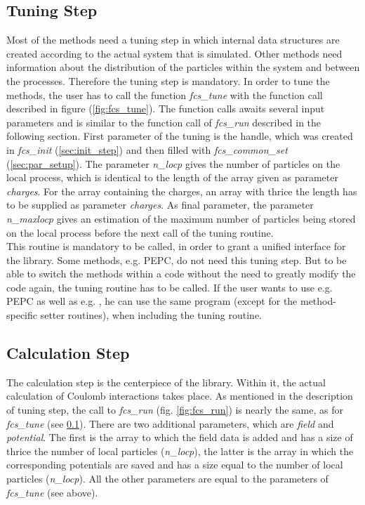 \subsection{Tuning Step}
\label{sec:tune_step}



Most of the methods need a tuning step in which internal data structures are created according to the actual system that is simulated. Other methods
need information about the distribution of the particles within the system and between the processes. Therefore the tuning step is mandatory. In order
to tune the methods, the user has to call the function \textit{fcs\_tune} with the function call described in figure (\ref{fig:fcs_tune}). The function
calls awaits several input parameters and is similar to the function call of \textit{fcs\_run} described in the following section. First parameter of the
tuning is the handle, which was created in \textit{fcs\_init} (\ref{sec:init_step}) and then filled with \textit{fcs\_common\_set} (\ref{sec:par_setup}).
The parameter \textit{n\_locp} gives the number of particles on the local process, which is identical to the length of the array given as parameter 
\textit{charges}. For the array containing the charges, an array with thrice the length has to be supplied as parameter \textit{charges}. As final parameter,
the parameter \textit{n\_maxlocp} gives an estimation of the maximum number of particles being stored on the local process before the next call of the tuning
routine.\\
This routine is mandatory to be called, in order to grant a unified interface for the library. Some methods, e.g. PEPC, do not need this tuning step. But to be
able to switch the methods within a code without the need to greatly modify the code again, the tuning routine has to be called. If the user wants to use e.g. PEPC
as well as e.g. \ptwonfft, he can use the same program (except for the method-specific setter routines), when including the tuning routine. 

\subsection{Calculation Step}
\label{sec:run_step}



The calculation step is the centerpiece of the library. Within it, the actual calculation of Coulomb interactions takes place. As mentioned in the description of tuning step,
the call to \textit{fcs\_run} (fig. \ref{fig:fcs_run}) is nearly the same, as for \textit{fcs\_tune} (see \ref{sec:tune_step}). There are two additional parameters, which are \textit{field} and
\textit{potential}. The first is the array to which the field data is added and has a size of thrice the number of local particles (\textit{n\_locp}), the latter
is the array in which the corresponding potentials are saved and has a size equal to the number of local particles (\textit{n\_locp}). All the other parameters
are equal to the parameters of \textit{fcs\_tune} (see above).


